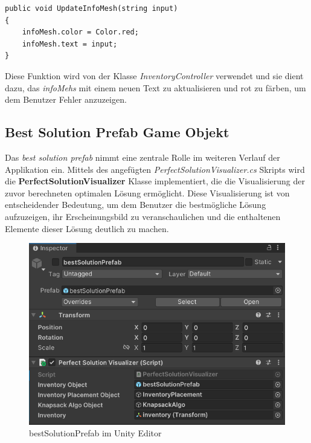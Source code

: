 \begin{lstlisting}[style=csharp, caption={Funktion um InfoMesh zu verändern}]
public void UpdateInfoMesh(string input)
{
    infoMesh.color = Color.red;
    infoMesh.text = input;
}
\end{lstlisting}
Diese Funktion wird von der Klasse \textit{InventoryController} verwendet und sie dient dazu, das \textit{infoMehs} mit
einem neuen Text zu aktualisieren und rot zu färben, um dem Benutzer Fehler anzuzeigen.

\subsection{Best Solution Prefab Game Objekt}
Das \textit{best solution prefab} nimmt eine zentrale Rolle im weiteren Verlauf der Applikation ein. Mittels des angefügten
\textit{PerfectSolutionVisualizer.cs} Skripts wird die \textbf{PerfectSolutionVisualizer} Klasse implementiert, die die
Visualisierung der zuvor berechneten optimalen Lösung ermöglicht. Diese Visualisierung ist von entscheidender Bedeutung,
um dem Benutzer die bestmögliche Lösung aufzuzeigen, ihr Erscheinungsbild zu veranschaulichen und die enthaltenen Elemente
dieser Lösung deutlich zu machen.
\begin{figure}[h]
    \centering
    \includegraphics[scale=0.8]{images/bestSolPref_Editor}
    \caption{bestSolutionPrefab im Unity Editor}
    \label{fig:bestSol_Editor}
\end{figure}


